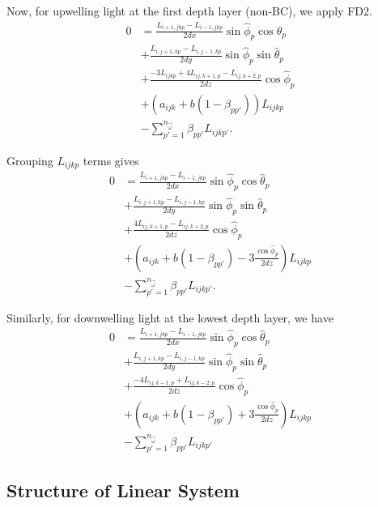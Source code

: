 Now, for upwelling light at the first depth layer (non-BC), we apply FD2.
\begin{equation}
  \begin{aligned}
    0 &= \frac{L_{i+1,jkp}-L_{i-1,jkp}}{2dx}\sin\hat{\phi}_p\cos\hat{\theta}_p \\
    &+ \frac{L_{i,j+1,kp}-L_{i,j-1,kp}}{2dy}\sin\hat{\phi}_p\sin\hat{\theta}_p \\
    &+ \frac{-3L_{ijkp} + 4L_{ij,k+1,p} - L_{ij,k+2,p}}{2dz}\cos\hat{\phi}_p \\
    &+ (a_{ijk}+b(1-\beta_{pp'}))L_{ijkp} \\
    &- \sum_{p'=1}^{n_{\vec{\omega}}} \beta_{pp'} L_{ijkp'}.
  \end{aligned}
\end{equation}

Grouping $L_{ijkp}$ terms gives
\begin{equation}
  \begin{aligned}
    0 &= \frac{L_{i+1,jkp}-L_{i-1,jkp}}{2dx}\sin\hat{\phi}_p\cos\hat{\theta}_p \\
    &+ \frac{L_{i,j+1,kp}-L_{i,j-1,kp}}{2dy}\sin\hat{\phi}_p\sin\hat{\theta}_p \\
    &+ \frac{4L_{ij,k+1,p} - L_{ij,k+2,p}}{2dz}\cos\hat{\phi}_p \\
    &+ \left(a_{ijk}+b(1-\beta_{pp'}) - 3\frac{\cos\hat\phi_p}{2dz} \right)L_{ijkp} \\
    &- \sum_{p'=1}^{n_{\vec{\omega}}} \beta_{pp'} L_{ijkp'}.
  \end{aligned}
\end{equation}

Similarly, for downwelling light at the lowest depth layer, we have
\begin{equation}
  \begin{aligned}
    0 &= \frac{L_{i+1,jkp}-L_{i-1,jkp}}{2dx}\sin\hat{\phi}_p\cos\hat{\theta}_p \\
    &+ \frac{L_{i,j+1,kp}-L_{i,j-1,kp}}{2dy}\sin\hat{\phi}_p\sin\hat{\theta}_p \\
    &+ \frac{-4L_{ij,k-1,p} + L_{ij,k-2,p}}{2dz}\cos\hat{\phi}_p \\
    &+ \left(a_{ijk}+b(1-\beta_{pp'}) + 3\frac{\cos\hat\phi_p}{2dz} \right)L_{ijkp} \\
    &- \sum_{p'=1}^{n_{\vec{\omega}}} \beta_{pp'} L_{ijkp'}
  \end{aligned}
\end{equation}

\subsection{Structure of Linear System}

